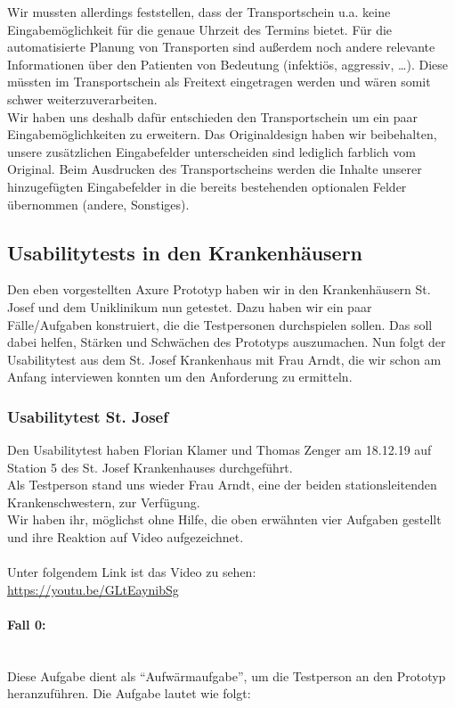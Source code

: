 \documentclass[a4paper, ngerman, 12pt]{scrartcl}
\begin{document}
Wir mussten allerdings feststellen, dass der Transportschein u.a. keine Eingabemöglichkeit für die genaue Uhrzeit des Termins bietet. Für die automatisierte Planung von Transporten sind außerdem noch andere relevante Informationen über den Patienten von Bedeutung (infektiös, aggressiv, …). Diese müssten im Transportschein als Freitext eingetragen werden und wären somit schwer weiterzuverarbeiten.\\

Wir haben uns deshalb dafür entschieden den Transportschein um ein paar Eingabemöglichkeiten zu erweitern. Das Originaldesign haben wir beibehalten, unsere zusätzlichen Eingabefelder unterscheiden sind lediglich farblich vom Original. Beim Ausdrucken des Transportscheins werden die Inhalte unserer hinzugefügten Eingabefelder in die bereits bestehenden optionalen Felder übernommen (andere, Sonstiges).
\subsection{Usabilitytests in den Krankenhäusern}
Den eben vorgestellten Axure Prototyp haben wir in den Krankenhäusern St. Josef und dem Uniklinikum nun getestet. Dazu haben wir ein paar Fälle/Aufgaben konstruiert, die die Testpersonen durchspielen sollen. Das soll dabei helfen, Stärken und Schwächen des Prototyps auszumachen. Nun folgt der Usabilitytest aus dem St. Josef Krankenhaus mit Frau Arndt, die wir schon am Anfang interviewen konnten um den Anforderung zu ermitteln.
\subsubsection{Usabilitytest St. Josef}
Den Usabilitytest haben Florian Klamer und Thomas Zenger am 18.12.19 auf Station 5 des St. Josef Krankenhauses durchgeführt.\\
Als Testperson stand uns wieder Frau Arndt, eine der beiden stationsleitenden Krankenschwestern, zur Verfügung.\\
Wir haben ihr, möglichst ohne Hilfe, die oben erwähnten vier Aufgaben gestellt und ihre Reaktion auf Video aufgezeichnet.\\
\\
Unter folgendem Link ist das Video zu sehen:\\
\href{https://youtu.be/GLtEaynibSg}{https://youtu.be/GLtEaynibSg}\\
\paragraph{Fall 0:}\leavevmode\\
Diese Aufgabe dient als ``Aufwärmaufgabe'', um die Testperson an den Prototyp heranzuführen. Die Aufgabe lautet wie folgt:\\
\end{document}
